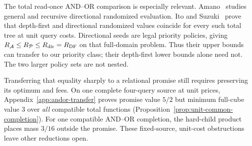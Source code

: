 \documentclass[pdflatex,sn-mathphys-num]{sn-jnl}
\theoremstyle{thmstyleone}
\theoremstyle{thmstylethree}
\theoremstyle{thmstyletwo}
\begin{document}
The total read-once AND--OR comparison is especially relevant.
Amano~\cite{amano2011directional} studies general and recursive directional
randomized evaluation. Ito and Suzuki~\cite{itosuzuki2025collapse} prove
that depth-first and directional randomized values coincide for every
such total tree at unit query costs. Directional seeds are legal priority
policies, giving $R_{\mathcal A}\le R_{\mathcal P}\le R_{\rm dir}=R_{\rm DF}$
on that full-domain problem. Thus their upper bounds can transfer to our
priority class; their depth-first lower bounds alone need not.
The two larger policy sets are not nested.

Transferring that equality sharply to a relational promise still requires
preserving its optimum and fees. On one complete four-query source at unit
prices, Appendix~\ref{app:andor-transfer} proves promise value $5/2$ but
minimum full-cube value $3$ over \emph{all} compatible total functions
(Proposition~\ref{prop:unit-common-completion}). For one compatible AND--OR
completion, the hard-child product places mass $3/16$ outside the promise.
These fixed-source, unit-cost obstructions leave other reductions open.
\end{document}
